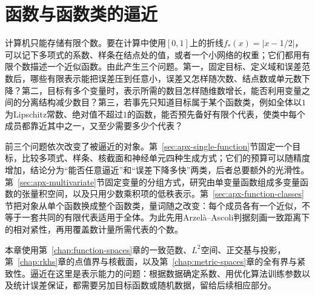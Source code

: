 \chapter{函数与函数类的逼近}
\label{chap:function-approximation}

计算机只能存储有限个数。要在计算中使用$[0,1]$上的折线$f_*(x)=|x-1/2|$，可以记下多项式的系数、样条在结点处的值，或者一个小网络的权重；它们都用有限个数描述一个近似函数。由此产生三个问题。第一，固定目标、定义域和误差范数后，哪些有限表示能把误差压到任意小，误差又怎样随次数、结点数或单元数下降？第二，目标有多个变量时，表示所需的数目怎样随维数增长，能否利用变量之间的分离结构减少数目？第三，若事先只知道目标属于某个函数类，例如全体以$1$为Lipschitz常数、绝对值不超过$1$的函数，能否预先备好有限个代表，使类中每个成员都靠近其中之一，又至少需要多少个代表？

前三个问题依次改变了被逼近的对象。第~\ref{sec:apx-single-function}节固定一个目标，比较多项式、样条、核截面和神经单元四种生成方式；它们的预算可以随精度增加，结论分为“能否任意逼近”和“误差下降多快”两类，后者总要额外的光滑性。第~\ref{sec:apx-multivariate}节固定变量的分组方式，研究由单变量函数组成多变量函数的张量积空间，以及只用少数乘积项的低秩表示。第~\ref{sec:apx-function-classes}节把对象从单个函数换成整个函数类，量词随之改变：每个成员各有一个近似，不等于一套共同的有限代表适用于全体。为此先用Arzelà--Ascoli判据刻画一致距离下的相对紧性，再用覆盖数计量所需代表的个数。

本章使用第~\ref{chap:function-spaces}章的一致范数、$L^2$空间、正交基与投影，第~\ref{chap:rkhs}章的点值界与核截面，以及第~\ref{chap:metric-spaces}章的全有界与紧致性。逼近在这里是表示能力的问题：根据数据确定系数、用优化算法训练参数以及统计误差保证，都需要另加目标函数或随机数据，留给后续相应部分。





